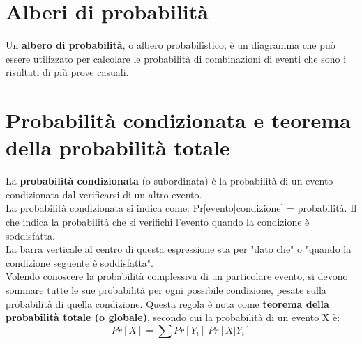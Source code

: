 \documentclass[drafts, 10pt]{book}
\begin{document}
\section{Alberi di probabilità}
Un \textbf{albero di probabilità}, o albero probabilistico, è un diagramma che può essere utilizzato per calcolare le probabilità di combinazioni di eventi che sono i risultati di più prove casuali.

\section{Probabilità condizionata e teorema della probabilità totale}
La \textbf{probabilità condizionata} (o subordinata) è la probabilità di un evento condizionata dal verificarsi di un altro evento.
\\
La probabilità condizionata si indica come: Pr[evento|condizione] = probabilità.
Il che indica la probabilità che si verifichi l'evento quando la condizione è soddisfatta.
\\
La barra verticale al centro di questa espressione sta per "dato che" o "quando la condizione seguente è soddisfatta".
\\
Volendo conoscere la probabilità complessiva di un particolare evento, si devono sommare tutte le sue probabilità per ogni possibile condizione, pesate sulla probabilità di quella condizione. Questa regola è nota come \textbf{teorema della probabilità totale (o globale)}, secondo cui la probabilità di un evento X è:
\begin{equation}
    Pr[X] = \sum{Pr[Y_i]\ Pr[X | Y_i]}
\end{equation}
\end{document}
